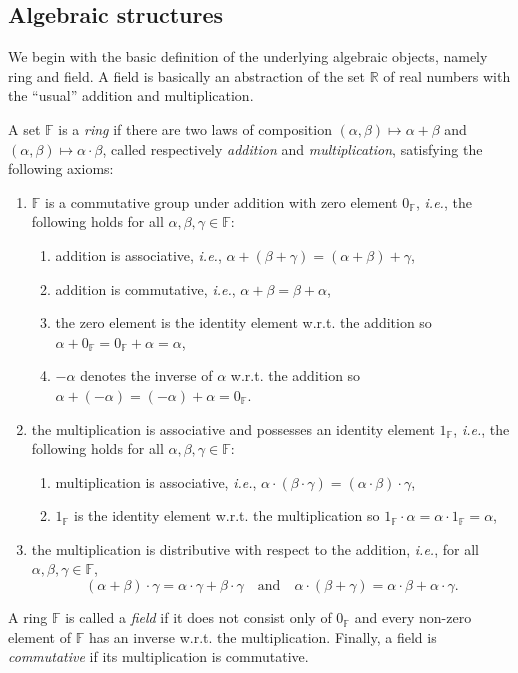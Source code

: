 \documentclass[a4paper]{paper}
\makeatletter
\newcommand{\Field}{\mathbb{F}}
\newcommand{\Real}{\mathbb{R}}
\newcommand{\ie}{\textsl{i.e.}\xspace}
\newcommand{\wrt}{{w.r.t.}\@\xspace}
\makeatother
\begin{document}
\subsection{Algebraic structures}
We begin with the basic definition of the underlying algebraic objects, namely ring and field.
A field is basically an abstraction of the set $\Real$ of real numbers with the ``usual'' 
addition and multiplication.
\begin{definition}
  A set $\Field$ is a \emph{ring} if there are two laws of composition
  $(\alpha,\beta)\mapsto \alpha+\beta$ and $(\alpha,\beta) \mapsto \alpha\cdot \beta$, called 
  respectively \emph{addition} and \emph{multiplication}, satisfying the following axioms:
  \begin{enumerate}
  \item $\Field$ is a commutative group under addition with zero element $0_{\Field}$, \ie,
    the following holds for all $\alpha,\beta,\gamma\in \Field$:
    \begin{enumerate}
    \item addition is associative, \ie, $\alpha + (\beta+\gamma)=(\alpha+\beta)+\gamma$,
    \item addition is commutative, \ie, $\alpha + \beta = \beta+\alpha$,
    \item the zero element is the identity element \wrt the addition so 
       $\alpha+0_{\Field}=0_{\Field}+\alpha=\alpha$,
    \item $-\alpha$ denotes the inverse of $\alpha$  \wrt the addition so 
       $\alpha+(-\alpha)=(-\alpha)+\alpha=0_{\Field}$.
    \end{enumerate}
  \item the multiplication is associative and possesses an identity element $1_{\Field}$, \ie,
    the following holds for all $\alpha,\beta,\gamma\in \Field$:
    \begin{enumerate}
    \item multiplication is associative, \ie, 
      $\alpha\cdot (\beta\cdot \gamma)=(\alpha\cdot \beta)\cdot \gamma$,
   \item $1_{\Field}$ is the identity element \wrt the multiplication so 
      $1_{\Field}\cdot \alpha=\alpha \cdot 1_{\Field}=\alpha$, 
  \end{enumerate}
  \item the multiplication is distributive with respect to the addition, \ie,
    for all $\alpha,\beta,\gamma\in \Field$,
    \[ (\alpha+\beta)\cdot \gamma = \alpha \cdot \gamma+\beta\cdot\gamma 
       \quad\text{and}\quad
       \alpha \cdot (\beta + \gamma) = \alpha \cdot \beta+\alpha\cdot\gamma.
    \]
  \end{enumerate}
  A ring $\Field$ is called a \emph{field} if it does not consist only of $0_{\Field}$ and every non-zero 
  element of $\Field$ has an inverse \wrt the multiplication. Finally, a field is \emph{commutative}
  if its multiplication is commutative.
\end{definition}
\end{document}
